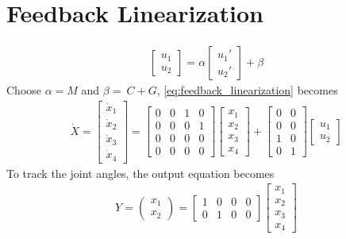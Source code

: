 \documentclass[french]{article}
\begin{document}
	\section{Feedback Linearization}
	\begin{align}
	\begin{bmatrix}
	u_1 \\ 
	u_2
	\end{bmatrix} = \alpha \begin{bmatrix}
	u_1' \\ 
	u_2'
	\end{bmatrix} + \beta
	\end{align}
	Choose $\alpha = M$ and $\beta = ~ C + G$, \cref{eq:feedback_linearization} becomes
	\begin{align}
	\dot{X} = \begin{bmatrix}
	\dot{x}_1 \\ 
	\dot{x}_2 \\ 
	\dot{x}_3 \\ 
	\dot{x}_4
	\end{bmatrix} = \begin{bmatrix}
	0 & 0 & 1 & 0 \\ 
	0 & 0 & 0 & 1 \\ 
	0 & 0 & 0 & 0 \\ 
	0 & 0 & 0 & 0
	\end{bmatrix} \begin{bmatrix}
	{x}_1 \\ 
	{x}_2 \\ 
	{x}_3 \\ 
	{x}_4
	\end{bmatrix} + \begin{bmatrix}
	0 & 0 \\ 
	0 & 0 \\ 
	1 & 0 \\ 
	0 & 1
	\end{bmatrix} \begin{bmatrix}
	u_1 \\ 
	u_2
	\end{bmatrix} 
	\end{align}
	To track the joint angles, the output equation becomes
	\begin{align}
	Y = \begin{pmatrix}
	x_1 \\ 
	x_2
	\end{pmatrix} = \begin{bmatrix}
	1 & 0 & 0 & 0 \\ 
	0 & 1 & 0 & 0
	\end{bmatrix} \begin{bmatrix}
	{x}_1 \\ 
	{x}_2 \\ 
	{x}_3 \\ 
	{x}_4
	\end{bmatrix}
	\end{align}
\end{document}
